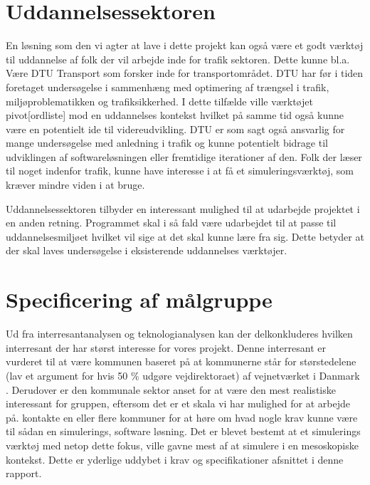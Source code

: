 \section{Uddannelsessektoren}
En løsning som den vi agter at lave i dette projekt kan også være et godt værktøj til uddannelse af folk der vil arbejde inde for trafik sektoren. Dette kunne bl.a. Være DTU Transport som forsker inde for transportområdet. DTU har før i tiden foretaget undersøgelse i sammenhæng med optimering af trængsel i trafik, miljøproblematikken og trafiksikkerhed\cite{DtuForskning}. I dette tilfælde ville værktøjet pivot[ordliste] mod en uddannelses kontekst hvilket på samme tid også kunne være en potentielt ide til videreudvikling. DTU er som sagt også ansvarlig for mange undersøgelse med anledning i trafik og kunne potentielt bidrage til udviklingen af softwareløsningen eller fremtidige iterationer af den. Folk der læser til noget indenfor trafik, kunne have interesse i at få et simuleringsværktøj, som kræver mindre viden i at bruge.

\vspace{5mm}

Uddannelsessektoren tilbyder en interessant mulighed til at udarbejde projektet i en anden retning. Programmet skal i så fald være udarbejdet til at passe til uddannelsesmiljøet hvilket vil sige at det skal kunne lære fra sig. Dette betyder at der skal laves undersøgelse i eksisterende uddannelses værktøjer.

\section{Specificering af målgruppe}

Ud fra interresantanalysen og teknologianalysen kan der delkonkluderes hvilken interresant der har størst interesse for vores projekt. Denne interresant er vurderet til at være kommunen baseret på at kommunerne står for størstedelene (lav et argument for hvis 50 \% udgøre vejdirektoraet) af vejnetværket i Danmark \cite{benjasfar}. Derudover er den kommunale sektor anset for at være den mest realistiske interessant for gruppen, eftersom det er et skala vi har mulighed for at arbejde på. kontakte en eller flere kommuner for at høre om hvad nogle krav kunne være til sådan en simulerings, software løsning. Det er blevet bestemt at et simulerings værktøj med netop dette fokus, ville gavne mest af at simulere i en mesoskopiske kontekst. Dette er yderlige uddybet i krav og specifikationer afsnittet i denne rapport.
